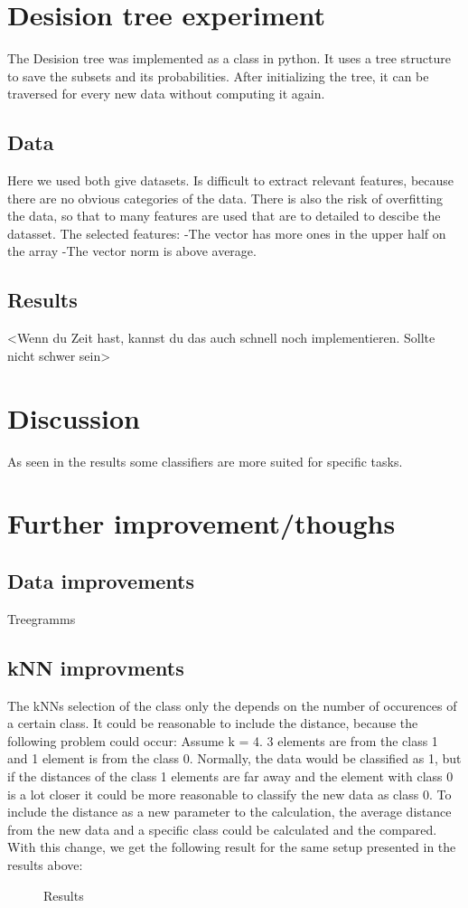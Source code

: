 \documentclass[a4paper,12pt]{article}
\newcommand{\initials}[1]{\marginpar{\quad\texttt{#1}}}
\begin{document}
\section{Desision tree experiment}
The Desision tree was implemented as a class in python. It uses a tree structure to save the subsets and its probabilities. After initializing the tree, it can be traversed for every new data without computing it again.
\subsection{Data}
Here we used both give datasets. Is difficult to extract relevant features, because there are no obvious categories of the data. There is also the risk of overfitting the data, so that to many features are used that are to detailed to descibe the datasset.
The selected features:
-The vector has more ones in the upper half on the array
-The vector norm is above average.
\subsection{Results}
<Wenn du Zeit hast, kannst du das auch schnell noch implementieren. Sollte nicht schwer sein>
\section{Discussion}
As seen in the results some classifiers are more suited for specific tasks.
\initials{TB/MA}

\section{Further improvement/thoughs}
\subsection{Data improvements}
Treegramms
\initials{TB}
\subsection{kNN improvments}
The kNNs selection of the class only the depends on the number of occurences of a certain class. It could be reasonable to include the distance, because the following problem could occur:
Assume k = 4. 3 elements are from the class 1 and 1 element is from the class 0. Normally, the data would be classified as 1, but if the distances of the class 1 elements are far away and the element with class 0 is a lot closer it could be more reasonable to classify the new data as class 0.
To include the distance as a new parameter to the calculation, the average distance from the new data and a specific class could be calculated and the compared. With this change, we get the following result for the same setup presented in the results above:
\begin{figure}[h]
\centering
\caption{Results}
\label{fig_res}
\end{figure}
\end{document}
